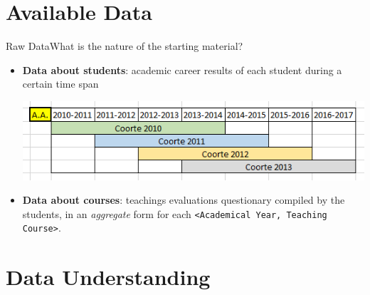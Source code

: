 \section{Available Data}
\begin{frame}{Raw Data}{What is the nature of the starting material?}

\begin{itemize}

    \item<1->\textbf{Data about \alert{students}}: academic career results of each student during a certain time span \\
        \noindent\begin{centering}
            \includegraphics[scale=0.50]{../raw/stud_comp.png}
        \end{centering}

    \item<2->\textbf{Data about \alert{courses}}: teachings evaluations questionary compiled by the students, in an \emph{aggregate} form for each \texttt{<Academical Year, Teaching Course>}.

\end{itemize}

\end{frame}

\section{Data Understanding}
